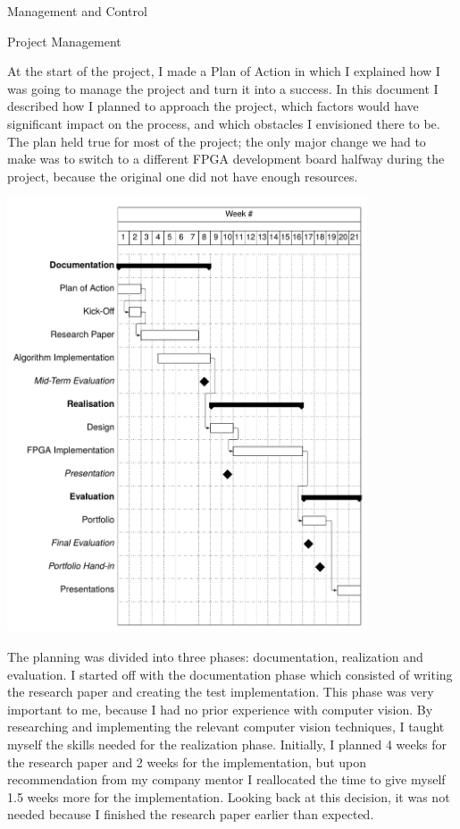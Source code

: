 \documentclass{matthijs}
\begin{document}
	\begin{hoofdstuk}{Management and Control}

		\setlength\parindent{1.5em}
		\setlength{\parskip}{0.5em plus 0.2em minus 0.1em}
		\linespread{1.2}
		\vspace{-2.5ex}
		
		\begin{paragraaf}{Project Management}
	
			At the start of the project, I made a Plan of Action in which I explained how I was going to manage the project and turn it into a success.
			In this document I described how I planned to approach the project, which factors would have significant impact on the process, and which obstacles I envisioned there to be.
			The plan held true for most of the project; the only major change we had to make was to switch to a different FPGA development board halfway during the project, because the original one did not have enough resources.

			\includegraphics[width=0.8\textwidth, clip, trim=0cm 10.1cm 0cm 0cm]{planning.pdf}
			\vspace{0.25ex}

			\noindent The planning was divided into three phases: documentation, realization and evaluation.
			I started off with the documentation phase which consisted of writing the research paper and creating the test implementation.
			This phase was very important to me, because I had no prior experience with computer vision.
			By researching and implementing the relevant computer vision techniques, I taught myself the skills needed for the realization phase.
			Initially, I planned 4 weeks for the research paper and 2 weeks for the implementation, but upon recommendation from my company mentor I reallocated the time to give myself 1.5 weeks more for the implementation.
			Looking back at this decision, it was not needed because I finished the research paper earlier than expected.


\end{paragraaf}
\end{hoofdstuk}
\end{document}
